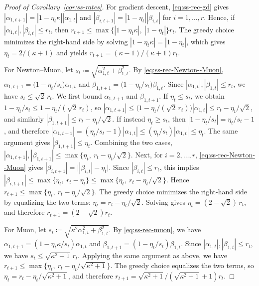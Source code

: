 \documentclass[11pt]{article}
\begin{document}
\begin{proof}[Proof of Corollary~\ref{cor:ss-rates}]
For gradient descent, \eqref{eq:ss-rec-gd} gives $|\alpha_{1,t+1}| = |1-\eta_t\kappa| |\alpha_{1,t}|$ and $|\beta_{i,t+1}| = |1-\eta_t| |\beta_{i,t}|$ for $i=1,\dots,r$. Hence, if $|\alpha_{1,t}|, |\beta_{i,t}| \le r_t$, then $r_{t+1} \le \max\{|1-\eta_t\kappa|,\ |1-\eta_t|\} r_t$. The greedy choice minimizes the right-hand side by solving $|1-\eta_t\kappa| = |1-\eta_t|$, which gives $\eta_t = 2/(\kappa+1)$ and yields $r_{t+1} = (\kappa-1)/(\kappa+1) r_t$.

For Newton--Muon, let $s_t \coloneqq \sqrt{\alpha_{1,t}^2+\beta_{1,t}^2}$. By \eqref{eq:ss-rec-Newton--Muon}, $\alpha_{1,t+1} = \bigl(1-\eta_t/s_t\bigr)\alpha_{1,t}$ and $\beta_{1,t+1} = \bigl(1-\eta_t/s_t\bigr)\beta_{1,t}$. Since $|\alpha_{1,t}|, |\beta_{1,t}| \le r_t$, we have $s_t \le \sqrt{2}\,r_t$. We first bound $\alpha_{1,t+1}$ and $\beta_{1,t+1}$. If $\eta_t \le s_t$, we obtain $1-\eta_t/s_t \le 1-\eta_t/(\sqrt{2}\,r_t)$, so $|\alpha_{1,t+1}| \le \bigl(1-\eta_t/(\sqrt{2}\,r_t)\bigr)|\alpha_{1,t}| \le r_t-\eta_t/\sqrt{2}$, and similarly $|\beta_{1,t+1}| \le r_t-\eta_t/\sqrt{2}$. If instead $\eta_t \ge s_t$, then $|1-\eta_t/s_t|=\eta_t/s_t-1$, and therefore $|\alpha_{1,t+1}| = (\eta_t/s_t-1)|\alpha_{1,t}| \le (\eta_t/s_t)|\alpha_{1,t}| \le \eta_t$. The same argument gives $|\beta_{1,t+1}| \le \eta_t$. Combining the two cases, $|\alpha_{1,t+1}|, |\beta_{1,t+1}| \le \max\{\eta_t,\ r_t-\eta_t/\sqrt{2}\}$. Next, for $i=2,\dots,r$, \eqref{eq:ss-rec-Newton--Muon} gives $|\beta_{i,t+1}|=\bigl||\beta_{i,t}|-\eta_t\bigr|$. Since $|\beta_{i,t}| \le r_t$, this implies $|\beta_{i,t+1}| \le \max\{\eta_t,\ r_t-\eta_t\} \le \max\{\eta_t,\ r_t-\eta_t/\sqrt{2}\}$. Hence $r_{t+1} \le \max\{\eta_t,\ r_t-\eta_t/\sqrt{2}\}$. The greedy choice minimizes the right-hand side by equalizing the two terms: $\eta_t = r_t-\eta_t/\sqrt{2}$. Solving gives $\eta_t = (2-\sqrt{2})\,r_t$, and therefore $r_{t+1} = (2-\sqrt{2}) r_t$.

For Muon, let $s_t \coloneqq \sqrt{\kappa^2\alpha_{1,t}^2+\beta_{1,t}^2}$. By \eqref{eq:ss-rec-muon}, we have $\alpha_{1,t+1} = (1-\eta_t\kappa/s_t)\alpha_{1,t}$ and $\beta_{1,t+1} = (1-\eta_t/s_t)\beta_{1,t}$. Since $|\alpha_{1,t}|, |\beta_{1,t}| \le r_t$, we have $s_t \le \sqrt{\kappa^2+1}\,r_t$. 
Applying the same argument as above, we have $r_{t+1} \le \max\{\eta_t,\ r_t-\eta_t/\sqrt{\kappa^2+1}\}$. The greedy choice equalizes the two terms, so $\eta_t = r_t-\eta_t/\sqrt{\kappa^2+1}$, and therefore $r_{t+1} = \sqrt{\kappa^2+1}/(\sqrt{\kappa^2+1}+1) r_t$.


\end{proof}
\end{document}
